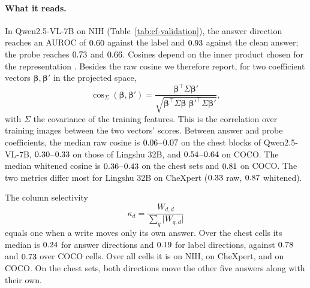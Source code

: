 \paragraph{What it reads.} In Qwen2.5-VL-7B on NIH (Table~\ref{tab:cf-validation}), the answer direction reaches an AUROC of $0.60$ against the label and $0.93$ against the clean answer; the probe reaches $0.73$ and $0.66$. Cosines depend on the inner product chosen for the representation \citep{park2024linear}. Besides the raw cosine we therefore report, for two coefficient vectors $\boldsymbol\beta,\boldsymbol\beta'$ in the projected space,
\begin{equation}
\cos_\Sigma(\boldsymbol\beta,\boldsymbol\beta')=\frac{\boldsymbol\beta^{\top}\Sigma\boldsymbol\beta'}{\sqrt{\boldsymbol\beta^{\top}\Sigma\boldsymbol\beta\;\boldsymbol\beta'^{\top}\Sigma\boldsymbol\beta'}},
\label{eq:whitened-cos}
\end{equation}
with $\Sigma$ the covariance of the training features. This is the correlation over training images between the two vectors' scores. Between answer and probe coefficients, the median raw cosine is $0.06$--$0.07$ on the chest blocks of Qwen2.5-VL-7B, $0.30$--$0.33$ on those of Lingshu 32B, and $0.54$--$0.64$ on COCO. The median whitened cosine is $0.36$--$0.43$ on the chest sets and $0.81$ on COCO. The two metrics differ most for Lingshu 32B on CheXpert ($0.33$ raw, $0.87$ whitened).

The column selectivity
\begin{equation}
\kappa_d=\frac{W_{d,d}}{\sum_q\lvert W_{q,d}\rvert}
\label{eq:column-selectivity}
\end{equation}
equals one when a write moves only its own answer. Over the \cfAnsColSelChestN{} chest cells its median is $0.24$ for answer directions and $0.19$ for label directions, against $0.78$ and $0.73$ over \cfAnsColSelCocoN{} COCO cells. Over all cells it is \cfValColSelNih{} on NIH, \cfValColSelChex{} on CheXpert, and \cfValColSelCoco{} on COCO. On the chest sets, both directions move the other five answers along with their own.



